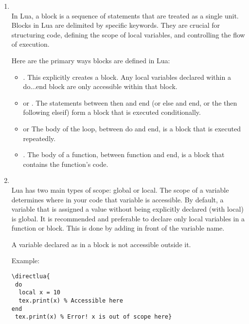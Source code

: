    \begin{enumerate}

  \item  {}\\
In Lua, a block is a sequence of statements that are treated as a single unit. Blocks in Lua are delimited by specific keywords. They are crucial for structuring code, defining the scope of local variables, and controlling the flow of execution.

Here are the primary ways blocks are defined in Lua:

\begin{itemize}
  \item {}. This explicitly creates a block. Any local variables declared within a do...end block are only accessible within that block.

  \item {} or . The statements between then and end (or else and end, or the then following elseif) form a block that is executed conditionally.

\item {} or  The body of the loop, between do and end, is a block that is executed repeatedly.

\item {}. The body of a function, between function and end, is a block that contains the function's code.
\end{itemize}


\item {}\\
Lua has two main types of scope: global or local. The scope of a variable determines where in your code that variable is accessible. By default, a variable that is assigned a value without being explicitly declared (with local) is global. It is recommended and preferable to declare only local variables in a function or block. This is done by adding  in front of the variable name.

A variable declared as  in a block is not accessible outside it.

Example:

\begin{mybox}
\begin{verbatim}
\directlua{
 do
  local x = 10
  tex.print(x) % Accessible here
end
 tex.print(x) % Error! x is out of scope here}
\end{verbatim}
\end{mybox}

\end{enumerate}


